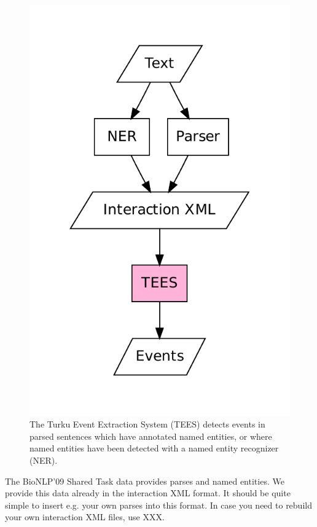 \documentclass[a4paper,12pt]{article}
\begin{document}
\begin{figure}[h]
\begin{center}
\includegraphics[scale=0.5]{Figures/overview.pdf}
\end{center}
\caption{The Turku Event Extraction System (TEES) detects events
in parsed sentences which have annotated named entities, or where named
entities have been detected with a named entity recognizer (NER).}
\label{fig-overview}
\end{figure}

The BioNLP'09 Shared Task data provides parses and named entities. We provide
this data already in the interaction XML format. It should be quite simple to
insert e.g. your own parses into this format. In case you need to rebuild your
own interaction XML files, use XXX.
\end{document}
